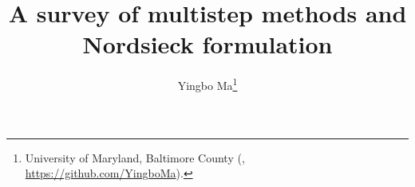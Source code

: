 

\usepackage{lipsum}
\usepackage{amsfonts}
\usepackage{graphicx}
\usepackage{epstopdf}
\usepackage{algorithmic}
\ifpdf
\else
\fi

\newcommand{\creflastconjunction}{, and~}



\title{A survey of multistep methods and Nordsieck formulation}

\author{Yingbo Ma\thanks{University of Maryland, Baltimore County
  (, \url{https://github.com/YingboMa}).}}

\usepackage{amsopn}
\DeclareMathOperator{\diag}{diag}


